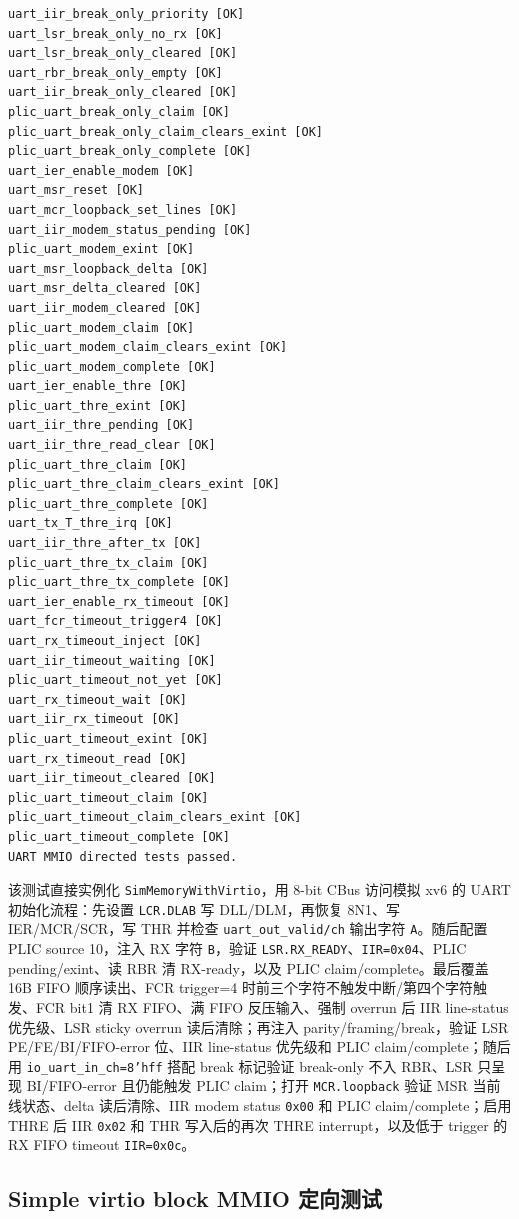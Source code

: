 \documentclass[UTF8,a4paper,11pt]{ctexart}
\begin{document}
\begin{Verbatim}[fontsize=\small]
uart_iir_break_only_priority [OK]
uart_lsr_break_only_no_rx [OK]
uart_lsr_break_only_cleared [OK]
uart_rbr_break_only_empty [OK]
uart_iir_break_only_cleared [OK]
plic_uart_break_only_claim [OK]
plic_uart_break_only_claim_clears_exint [OK]
plic_uart_break_only_complete [OK]
uart_ier_enable_modem [OK]
uart_msr_reset [OK]
uart_mcr_loopback_set_lines [OK]
uart_iir_modem_status_pending [OK]
plic_uart_modem_exint [OK]
uart_msr_loopback_delta [OK]
uart_msr_delta_cleared [OK]
uart_iir_modem_cleared [OK]
plic_uart_modem_claim [OK]
plic_uart_modem_claim_clears_exint [OK]
plic_uart_modem_complete [OK]
uart_ier_enable_thre [OK]
plic_uart_thre_exint [OK]
uart_iir_thre_pending [OK]
uart_iir_thre_read_clear [OK]
plic_uart_thre_claim [OK]
plic_uart_thre_claim_clears_exint [OK]
plic_uart_thre_complete [OK]
uart_tx_T_thre_irq [OK]
uart_iir_thre_after_tx [OK]
plic_uart_thre_tx_claim [OK]
plic_uart_thre_tx_complete [OK]
uart_ier_enable_rx_timeout [OK]
uart_fcr_timeout_trigger4 [OK]
uart_rx_timeout_inject [OK]
uart_iir_timeout_waiting [OK]
plic_uart_timeout_not_yet [OK]
uart_rx_timeout_wait [OK]
uart_iir_rx_timeout [OK]
plic_uart_timeout_exint [OK]
uart_rx_timeout_read [OK]
uart_iir_timeout_cleared [OK]
plic_uart_timeout_claim [OK]
plic_uart_timeout_claim_clears_exint [OK]
plic_uart_timeout_complete [OK]
UART MMIO directed tests passed.
\end{Verbatim}

该测试直接实例化 \texttt{SimMemoryWithVirtio}，用 8-bit CBus 访问模拟 xv6 的 UART 初始化流程：先设置 \texttt{LCR.DLAB} 写 DLL/DLM，再恢复 8N1、写 IER/MCR/SCR，写 THR 并检查 \texttt{uart\_out\_valid/ch} 输出字符 \texttt{A}。随后配置 PLIC source 10，注入 RX 字符 \texttt{B}，验证 \texttt{LSR.RX\_READY}、\texttt{IIR=0x04}、PLIC pending/exint、读 RBR 清 RX-ready，以及 PLIC claim/complete。最后覆盖 16B FIFO 顺序读出、FCR trigger=4 时前三个字符不触发中断/第四个字符触发、FCR bit1 清 RX FIFO、满 FIFO 反压输入、强制 overrun 后 IIR line-status 优先级、LSR sticky overrun 读后清除；再注入 parity/framing/break，验证 LSR PE/FE/BI/FIFO-error 位、IIR line-status 优先级和 PLIC claim/complete；随后用 \texttt{io\_uart\_in\_ch=8'hff} 搭配 break 标记验证 break-only 不入 RBR、LSR 只呈现 BI/FIFO-error 且仍能触发 PLIC claim；打开 \texttt{MCR.loopback} 验证 MSR 当前线状态、delta 读后清除、IIR modem status \texttt{0x00} 和 PLIC claim/complete；启用 THRE 后 IIR \texttt{0x02} 和 THR 写入后的再次 THRE interrupt，以及低于 trigger 的 RX FIFO timeout \texttt{IIR=0x0c}。

\subsection{Simple virtio block MMIO 定向测试}
\end{document}
